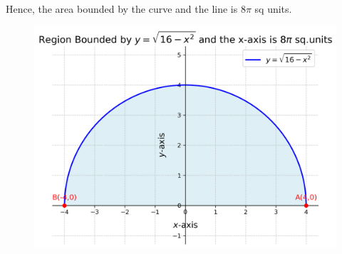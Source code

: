 \documentclass[journal,12pt,onecolumn]{IEEEtran}
\theoremstyle{remark}
\begin{document}
Hence, the area bounded by the curve and the line is $8\pi$ sq units.\\
\begin{figure}[h]
	\centering
	\includegraphics[scale=0.7]{codes/plot.png}
	\label{Fig}
\end{figure}
\end{document}
